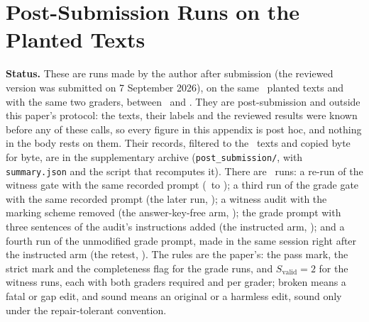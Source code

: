 \begin{table}[htbp]
  \caption{Every planted text by base. Grades: first run / re-query, with T or F for the completeness field and a superscript q where that grader quoted inside the edited passage (exact anchoring). Decisions, both graders required: first run / re-query, \CRacc\ accept, \CRrej\ reject. Class: F rows carry the post-hoc mechanism label. Obligation: the marking-scheme field the edited step falls under, the two fields the witness gate scores, by the scheme's letter and name (Appendices~\ref{app:rubric} and~\ref{app:closure}): \texttt{lower\_bound} is (T) termination on P1, (L) the lower bound on P3, (V) sufficiency on P5 and (F) finiteness on P6, and \texttt{upper\_bound} is (I) invariance, (U) the upper bound, (N) necessity and (P) periodicity; only on P3 are the two fields a lower and an upper bound. Disp.: one of the five disputed labels. Check: the edit has an executable check of the planted falsity; deletions have none.}
  \label{tab:permutant}
  \centering
  \CRfit{}
\end{table}

\section{Post-Submission Runs on the Planted Texts}
\label{app:postsub}
\textbf{Status.} These are runs made by the author after submission (the reviewed version was submitted on 7 September 2026), on the same \CRNTexts\ planted texts and with the same two graders, between \CRSepEightDateFirst\ and \CRRetestDateLast. They are post-submission and outside this paper's protocol: the texts, their labels and the reviewed results were known before any of these calls, so every figure in this appendix is post hoc, and nothing in the body rests on them. Their records, filtered to the \CRNTexts\ texts and copied byte for byte, are in the supplementary archive (\texttt{post\_submission/\allowbreak }, with \texttt{summary.json} and the script that recomputes it). There are \CRNPostSubArms\ runs: a re-run of the witness gate with the same recorded prompt (\CRKeyedRerunDateFirst\ to \CRKeyedRerunDateLast); a third run of the grade gate with the same recorded prompt (the later run, \CRSepEightDateFirst); a witness audit with the marking scheme removed (the answer-key-free arm, \CRKeyFreeDateFirst); the grade prompt with three sentences of the audit's instructions added (the instructed arm, \CRInstructedDateFirst); and a fourth run of the unmodified grade prompt, made in the same session right after the instructed arm (the retest, \CRRetestDateFirst). The rules are the paper's: the pass mark, the strict mark and the completeness flag for the grade runs, and $S_{\mathrm{valid}}{=}2$ for the witness runs, each with both graders required and per grader; broken means a fatal or gap edit, and sound means an original or a harmless edit, sound only under the repair-tolerant convention.

